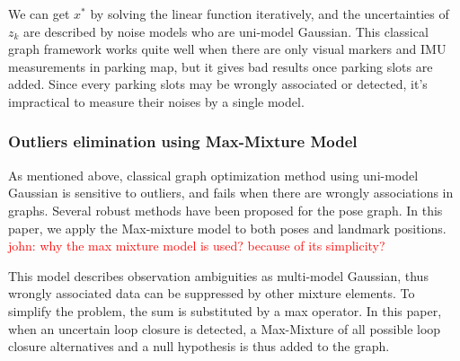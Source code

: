 \documentclass[journal]{IEEEtran}
\newcommand{\COMMENT}[1]{\textcolor{red}{#1}}
\begin{document}
We can get $x^*$ by solving the linear function iteratively, and the uncertainties of $z_k$ are described by noise models who are uni-model Gaussian. 
This classical graph framework works quite well when there are only visual markers and IMU measurements in parking map, but it gives bad results once parking slots are added.
Since every parking slots may be wrongly associated or detected, it's impractical to measure their noises by a single model. 

%



\subsubsection{Outliers elimination using Max-Mixture Model}
As mentioned above, classical graph optimization method using uni-model Gaussian is sensitive to outliers, and fails when there are wrongly associations in graphs.
Several robust methods\citet{maxmixture} \citet{Switchable Constrain} \citet{RRR} have been proposed for the pose graph.
In this paper, we apply the Max-mixture model to both poses and landmark positions.
\COMMENT{john: why the max mixture model is used? because of its simplicity?}

%

This model describes observation ambiguities as multi-model Gaussian, thus wrongly associated data can be suppressed by other mixture elements. 
To simplify the problem, the sum is substituted by a max operator. 
In this paper, when an uncertain loop closure is detected, a Max-Mixture of all possible loop closure alternatives and a null hypothesis is thus added to the graph.
\end{document}
